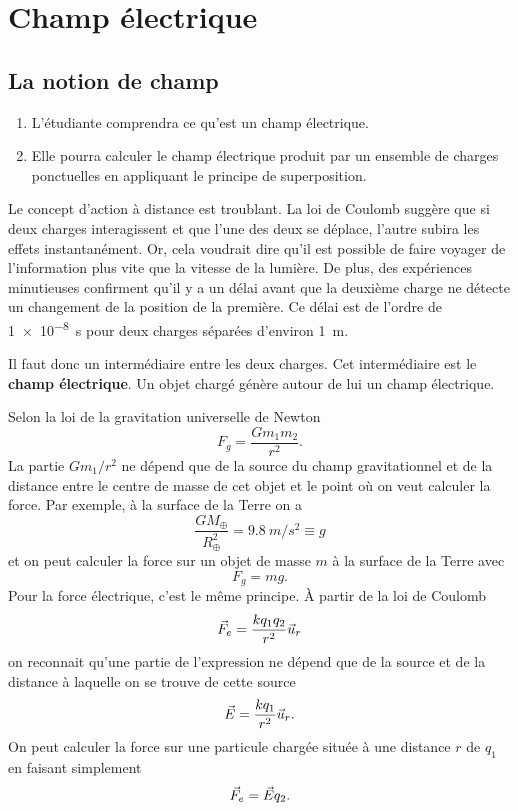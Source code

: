 \chapter{Champ électrique}

\section{La notion de champ}



\begin{enumerate}
  \item L'étudiante comprendra ce qu'est un champ électrique.
  \item Elle pourra calculer le champ électrique produit par un ensemble de
    charges ponctuelles en appliquant le principe de superposition.
\end{enumerate}


  Le concept d'action à distance est troublant. La loi de Coulomb suggère que
  si deux charges interagissent et que l'une des deux se déplace, l'autre
  subira les effets instantanément. Or, cela voudrait dire qu'il est possible
  de faire voyager de l'information plus vite que la vitesse de la lumière. De
  plus, des expériences minutieuses confirment qu'il y a un délai avant que la
  deuxième charge ne détecte un changement de la position de la première. Ce
  délai est de l'ordre de \SI{1e-8}{s} pour deux charges séparées d'environ
  \SI{1}{m}.

  Il faut donc un intermédiaire entre les deux charges. Cet intermédiaire est
  le \textbf{champ électrique}. Un objet chargé génère autour de lui un
  champ électrique.



Selon la loi de la gravitation universelle de Newton
\[
  F_g = \frac{Gm_1m_2}{r^2}.
\]
La partie $Gm_1 / r^2$ ne dépend que de la source du champ gravitationnel et de
la distance entre le centre de masse de cet objet et le point où on veut
calculer la force. Par exemple, à la surface de la Terre on a
\[
  \frac{GM_\oplus}{R_\oplus^2} = \SI{9.8}{m/s^2} \equiv g
\]
et on peut calculer la force sur un objet de masse $m$ à la surface de la Terre
avec
\[
  F_g = mg.
\]
Pour la force électrique, c'est le même principe. À partir de la loi de
Coulomb
\[
  \vec{F}_e = \frac{k q_1 q_2}{r^2} \vec{u}_r
\]
on reconnait qu'une partie de l'expression ne dépend que de la source et de la
distance à laquelle on se trouve de cette source
\[
  \vec{E} = \frac{k q_1}{r^2} \vec{u}_r.
\]
On peut calculer la force sur une particule chargée située à une distance $r$
de $q_1$ en faisant simplement
\[
  \vec{F}_e = \vec{E} q_2.
\]

